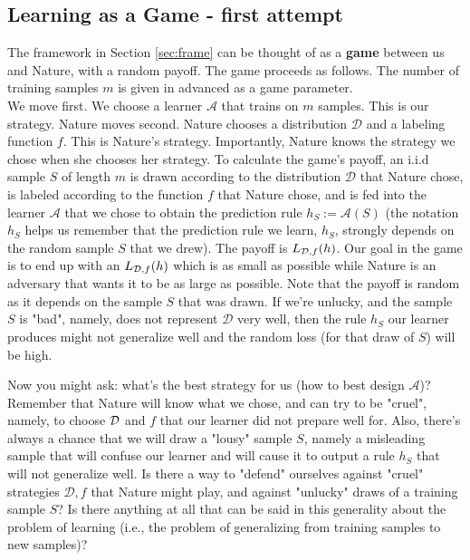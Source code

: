 {\subsection{Learning as a Game - first attempt}

The framework in Section \ref{sec:frame} can be thought of as a {\bf game} between us and Nature, with a random payoff. The game proceeds as follows. The number of training samples $m$ is given in advanced as a game parameter. \\

We move first. We choose a learner $\mathcal{A}$ that trains on $m$ samples. This is our strategy.
Nature moves second. Nature chooses a distribution $\mathcal{D}$ and a labeling function $f$. This is Nature's strategy. Importantly, Nature knows the strategy we chose when she chooses her strategy.
To calculate the game's payoff, an i.i.d sample $S$ of length $m$ is drawn according to the distribution $\mathcal{D}$ that Nature chose, is labeled according to the function $f$ that Nature chose, and is fed into the learner $\mathcal{A}$ that we chose to obtain the prediction rule $h_S:=\mathcal{A}(S)$ (the notation $h_S$ helps us remember that the prediction rule we learn, $h_S$, strongly depends on the random sample $S$ that we drew). The payoff is $L_{\mathcal{D},f}(h)$. Our goal in the game is to end up with an $L_{\mathcal{D},f}(h)$ which is as small as possible while Nature is an adversary that wants it to be as large as possible. Note that the payoff is random as it depends on the sample $S$ that was drawn. If we're unlucky, and the sample $S$ is "bad", namely, does not represent $\mathcal{D}$ very well, then the rule $h_S$ our learner produces might not generalize well and the random loss (for that draw of $S$) will be high. 

Now you might ask: what's the best strategy for us (how to best design $\mathcal{A}$)? 
Remember that Nature will know what we chose, and can try to be "cruel", namely, to choose $\mathcal{D}$ and $f$ that our learner did not prepare well for. Also, there's always a chance that we will draw a "lousy" sample $S$, namely a misleading sample that will confuse our learner and will cause it to output a rule $h_S$ that will not generalize well. Is there a way to "defend" ourselves against "cruel" strategies $\mathcal{D},f$ that Nature might play, and against "unlucky" draws of a training sample $S$? Is there anything at all that can be said in this generality about the problem of learning (i.e., the problem of generalizing from training samples to new samples)? 

}
